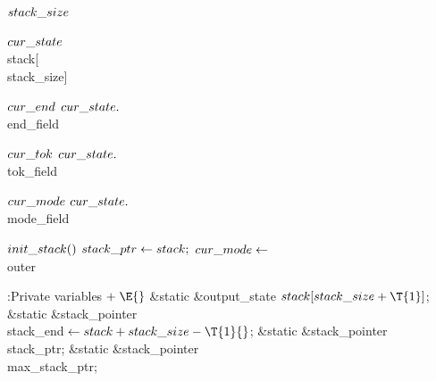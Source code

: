 \B\D$\\{stack\_size}$ \5
\par
\B\4\D$\\{cur\_state}$ \5
\\{stack}[\\{stack\_size}]\par
\B\4\D$\\{cur\_end}$ \5
$\\{cur\_state}.{}$\\{end\_field}\par
\B\4\D$\\{cur\_tok}$ \5
$\\{cur\_state}.{}$\\{tok\_field}\par
\B\4\D$\\{cur\_mode}$ \5
$\\{cur\_state}.{}$\\{mode\_field}\par
\B\4\D$\\{init\_stack}()$ \5
$\\{stack\_ptr}\leftarrow\\{stack};$ $\\{cur\_mode}\leftarrow{}$\\{outer}\par
\Y\B\4:Private variables\X${}\mathrel+\E{}$\6
\&{static} \&{output\_state} ${}\\{stack}[\\{stack\_size}+\T{1}]{}$;\6
\&{static} \&{stack\_pointer} \\{stack\_end}${}\K\\{stack}+\\{stack\_size}-%
\T{1}{}$;\6
\&{static} \&{stack\_pointer} \\{stack\_ptr};\6
\&{static} \&{stack\_pointer} \\{max\_stack\_ptr};\par
\fi

